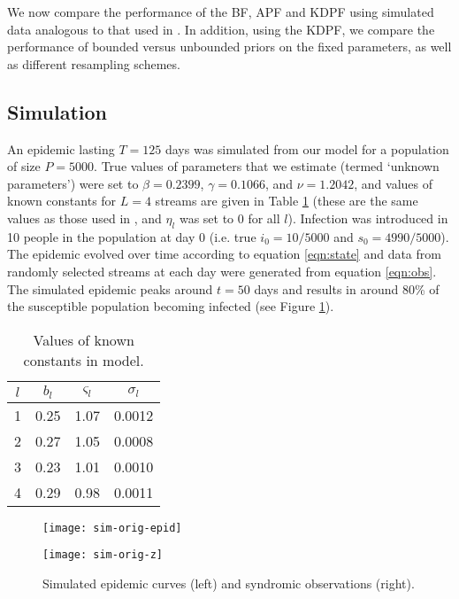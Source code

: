 \documentclass{elsarticle}
\begin{document}
We now compare the performance of the BF, APF and KDPF using simulated data analogous to that used in \citep{skvortsov2012monitoring}. In addition, using the KDPF, we compare the performance of bounded versus unbounded priors on the fixed parameters, as well as different resampling schemes.

\subsection{Simulation}

An epidemic lasting $T = 125$ days was simulated from our model for a population of size $P = 5000$. True values of parameters that we estimate (termed `unknown parameters') were set to $\beta = 0.2399$, $\gamma = 0.1066$, and $\nu = 1.2042$, and values of known constants for $L = 4$ streams are given in Table \ref{tab:constants} (these are the same values as those used in \citep{skvortsov2012monitoring}, and $\eta_l$ was set to 0 for all $l$). Infection was introduced in 10 people in the population at day 0 (i.e. true $i_0 = 10/5000$ and $s_0 = 4990/5000$). The epidemic evolved over time according to equation \eqref{eqn:state} and data from randomly selected streams at each day were generated from equation \eqref{eqn:obs}. The simulated epidemic peaks around $t = 50$ days and results in around 80\% of the susceptible population becoming infected (see Figure \ref{fig:data}).

\begin{table}[hb]
\begin{center}
\begin{tabular}{|cccc|}
\hline
$l$ & $b_l$ & $\varsigma_l$ & $\sigma_l$ \\
\hline
1 & 0.25 & 1.07 & 0.0012 \\
2 & 0.27 & 1.05 & 0.0008 \\
3 & 0.23 & 1.01 & 0.0010 \\
4 & 0.29 & 0.98 & 0.0011 \\
\hline
\end{tabular}
\caption{Values of known constants in model.}
\label{tab:constants}
\end{center}
\end{table}

\begin{figure}
\centering
\begin{minipage}{0.48\linewidth}
\texttt{[image: sim-orig-epid]}
\end{minipage}
\begin{minipage}{0.48\linewidth}
\texttt{[image: sim-orig-z]}
\end{minipage}
\caption{Simulated epidemic curves (left) and syndromic observations (right).} \label{fig:data}
\end{figure}
\end{document}
